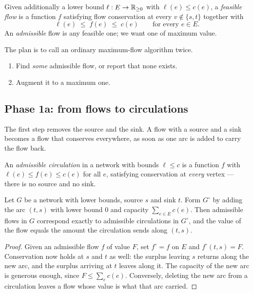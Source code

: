 \begin{definition}
Given additionally a lower bound $\ell : E \to \mathbb{R}_{\ge 0}$ with
$\ell(e) \le c(e)$, a \emph{feasible flow} is a function $f$ satisfying flow
conservation at every $v \notin \{s,t\}$ together with
\[ \ell(e) \;\le\; f(e) \;\le\; c(e) \qquad \text{for every } e \in E. \]
An \emph{admissible} flow is any feasible one; we want one of maximum value.
\end{definition}

The plan is to call an ordinary maximum-flow algorithm twice.

\begin{enumerate}[label=\textbf{Phase \arabic*.},leftmargin=*,wide=0pt]
  \item Find \emph{some} admissible flow, or report that none exists.
  \item Augment it to a maximum one.
\end{enumerate}

\subsection{Phase 1a: from flows to circulations}

The first step removes the source and the sink. A flow with a source and a
sink becomes a flow that conserves everywhere, as soon as one arc is added to
carry the flow back.

\begin{definition}[Circulation]
An \emph{admissible circulation} in a network with bounds $\ell \le c$ is a
function $f$ with $\ell(e) \le f(e) \le c(e)$ for all $e$, satisfying
conservation at \emph{every} vertex --- there is no source and no sink.
\end{definition}

\begin{lemma}\label{lem:flow-to-circulation}
Let $G$ be a network with lower bounds, source $s$ and sink $t$. Form $G^\circ$
by adding the arc $(t,s)$ with lower bound $0$ and capacity
$\sum_{e \in E} c(e)$. Then admissible flows in $G$ correspond exactly to
admissible circulations in $G^\circ$, and the value of the flow equals the
amount the circulation sends along $(t,s)$.
\end{lemma}

\begin{proof}
Given an admissible flow $f$ of value $F$, set $f^\circ = f$ on $E$ and
$f^\circ(t,s) = F$. Conservation now holds at $s$ and $t$ as well: the surplus
leaving $s$ returns along the new arc, and the surplus arriving at $t$ leaves
along it. The capacity of the new arc is generous enough, since
$F \le \sum_e c(e)$. Conversely, deleting the new arc from a circulation leaves
a flow whose value is what that arc carried.
\end{proof}

